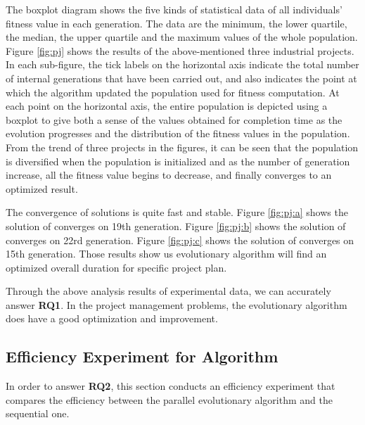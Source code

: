 The boxplot diagram shows the five kinds of statistical data of all individuals'
fitness value in each generation. The data are the minimum, the lower quartile,
the median, the upper quartile and the maximum values of the whole
population. Figure \ref{fig:pj} shows the results of the above-mentioned three
industrial projects. In each sub-figure, the tick labels on the horizontal axis
indicate the total number of internal generations that have been carried out,
and also indicates the point at which the algorithm updated the population used
for fitness computation. At each point on the horizontal axis, the entire
population is depicted using a boxplot to give both a sense of the values
obtained for completion time as the evolution progresses and the distribution of
the fitness values in the population. From the trend of three projects in the
figures, it can be seen that the population is diversified when the population
is initialized and as the number of generation increase, all the fitness value
begins to decrease, and finally converges to an optimized result.

The convergence of solutions is quite fast and stable. Figure \ref{fig:pj:a}
shows the solution of \projectA{} converges on 19th generation. Figure
\ref{fig:pj:b} shows the solution of \projectB{} converges on 22rd generation.
Figure \ref{fig:pj:c} shows the solution of \projectC{} converges on 15th
generation. Those results show us evolutionary algorithm will find an optimized
overall duration for specific project plan.

Through the above analysis results of experimental data, we can accurately
answer \textbf{RQ1}. In the project management problems, the evolutionary
algorithm does have a good optimization and improvement.


\subsection{Efficiency Experiment for Algorithm}
%
In order to answer \textbf{RQ2}, this section conducts an efficiency experiment
that compares the efficiency between the parallel evolutionary algorithm and the
sequential one.


